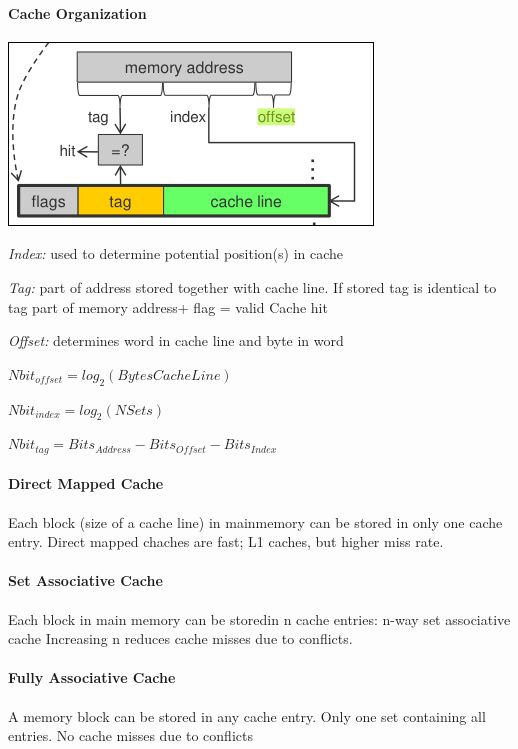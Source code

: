 \documentclass[fontsize=8pt]{scrartcl}
\newcommand{\coloreq}[1]{\colorbox{nordicRed}{\(\displaystyle #1\)}}
\begin{document}
\begin{multicols*}{4}
\paragraph{Cache Organization}
\begin{center}
  \includegraphics[width=0.8\linewidth]{img/CacheLine.png}
  \label{fig:cacheline}
\end{center}

\textit{Index:} used to determine potential position(s) in cache

\textit{Tag:} part of address stored together with cache line. If stored tag is identical to tag part of memory address+ flag = valid Cache hit

\textit{Offset:} determines word in cache line and byte in word

\coloreq{Nbit_{offset} = log_2(Bytes Cache Line)}

\coloreq{Nbit_{index} = log_2(NSets)}

\coloreq{Nbit_{tag} = Bits_{Address} - Bits_{Offset} - Bits_{Index}}

\paragraph{Direct Mapped Cache} Each block (size of a cache line) in mainmemory can be stored in only one cache entry. Direct mapped chaches are fast; L1 caches, but higher miss rate.

\paragraph{Set Associative Cache} Each block in main memory can be storedin n cache entries: n-way set associative cache Increasing n reduces cache misses due to conflicts.

\paragraph{Fully Associative Cache}A memory block can be stored in any cache entry. Only one set containing all entries. No cache misses due to conflicts


\end{multicols*}
\end{document}
